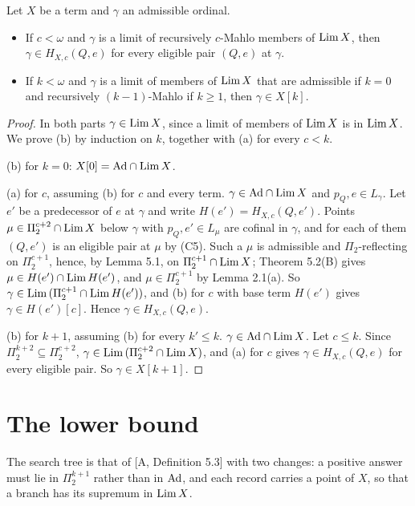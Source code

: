 \documentclass[11pt]{article}
\begin{document}
\begin{statement} Let $X$ be a term and $\gamma$ an admissible ordinal.
\begin{itemize}
\item[(a)] If $c < \omega$ and $\gamma$ is a limit of recursively $c$-Mahlo members of $\mathrm{Lim}\, X$, then $\gamma \in H_{X,c}(Q, e)$ for every
  eligible pair $(Q,e)$ at $\gamma$.
\item[(b)] If $k < \omega$ and $\gamma$ is a limit of members of $\mathrm{Lim}\, X$ that are admissible if $k = 0$ and recursively $(k-1)$-Mahlo if $k \ge 1$, then
  $\gamma \in X[k]$.
\end{itemize}
\end{statement}

\begin{proof}
In both parts $\gamma \in \mathrm{Lim}\, X$, since a limit of members of $\mathrm{Lim}\, X$ is in $\mathrm{Lim}\, X$. We prove (b) by induction on
$k$, together with (a) for every $c < k$.

(b) for $k = 0$: $X[0] = \mathrm{Ad} \cap \mathrm{Lim}\, X$.

(a) for $c$, assuming (b) for $c$ and every term. $\gamma \in \mathrm{Ad} \cap \mathrm{Lim}\, X$ and $p_Q, e \in L_\gamma$. Let $e'$ be a
predecessor of $e$ at $\gamma$ and write $H(e') = H_{X,c}(Q,e')$. Points $\mu \in \Pi_2^{c+2} \cap \mathrm{Lim}\, X$ below $\gamma$
with $p_Q, e' \in L_\mu$ are cofinal in $\gamma$, and for each of them $(Q, e')$ is an eligible pair at $\mu$ by (C5).
Such a $\mu$ is admissible and $\Pi_2$-reflecting on $\Pi_2^{c+1}$, hence, by Lemma 5.1, on $\Pi_2^{c+1} \cap \mathrm{Lim}\, X$;
Theorem 5.2(B) gives $\mu \in H(e') \cap \mathrm{Lim}\, H(e')$, and $\mu \in \Pi_2^{c+1}$ by Lemma 2.1(a). So $\gamma \in
\mathrm{Lim}\,(\Pi_2^{c+1} \cap \mathrm{Lim}\, H(e'))$, and (b) for $c$ with base term $H(e')$ gives $\gamma \in H(e')[c]$. Hence $\gamma \in
H_{X,c}(Q,e)$.

(b) for $k+1$, assuming (b) for every $k' \le k$. $\gamma \in \mathrm{Ad} \cap \mathrm{Lim}\, X$. Let $c \le k$. Since $\Pi_2^{k+2} \subseteq
\Pi_2^{c+2}$, $\gamma \in \mathrm{Lim}\,(\Pi_2^{c+2} \cap \mathrm{Lim}\, X)$, and (a) for $c$ gives $\gamma \in H_{X,c}(Q,e)$ for every eligible
pair. So $\gamma \in X[k+1]$.
\end{proof}

\section{The lower bound}

The search tree is that of [A, Definition 5.3] with two changes: a positive answer must lie in $\Pi_2^{k+1}$ rather than in
$\mathrm{Ad}$, and each record carries a point of $X$, so that a branch has its supremum in $\mathrm{Lim}\, X$.
\end{document}
